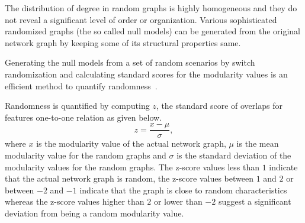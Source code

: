 The distribution of degree in random graphs is highly homogeneous and they do not reveal a significant level of order or organization. Various sophisticated randomized graphs (the so called null models) can be generated from the original network graph by keeping some of its structural properties same.~\cite{FORTUNATO201075}

Generating the null models from a set of random scenarios by switch randomization and calculating standard scores for the modularity values is an efficient method to quantify randomness~\cite{MERTEN2020, Enders2018}. 

Randomness is quantified by computing $z$, the standard score of overlaps for features one-to-one relation as given below.
\begin{equation} %
	z = \frac{x-\mu}{\sigma},
	\label{zscore}
\end{equation} 
where $x$ is the modularity value of the actual network graph, $\mu$ is the mean modularity value for the random graphs and $\sigma$ is the standard deviation of the modularity values for the random graphs. The z-score values less than $1$ indicate that the actual network graph is random, the z-score values between $1$ and $2$ or between $-2$ and $-1$ indicate that the graph is close to random characteristics whereas the z-score values higher than $2$ or lower than $-2$ suggest a significant deviation from being a random modularity value. 



